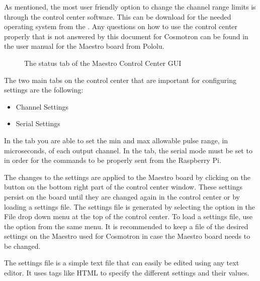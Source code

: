 \documentclass[letterpaper,10pt,english]{sphinxmanual}
\begin{document}
\sphinxAtStartPar
As mentioned, the most user friendly option to change the channel range limits is
through the control center software. This can be download for the needed operating
system from the . Any questions on how to use the
control center properly that is not answered by this document for Cosmotron can be
found in the user manual for the Maestro board from Pololu.

\begin{figure}[htbp]
\centering
\capstart

\noindent{}
\caption{The status tab of the Maestro Control Center GUI}\label{\detokenize{range:id1}}\end{figure}

\sphinxAtStartPar
The two main tabs on the control center that are important for configuring settings
are the following:
\begin{itemize}
\item {} 
\sphinxAtStartPar
Channel Settings

\item {} 
\sphinxAtStartPar
Serial Settings

\end{itemize}

\sphinxAtStartPar
In the  tab you are able to set the min and max allowable pulse
range, in microseconds, of each output channel. In the  tab, the
serial mode must be set to  in order for the commands to be properly
sent from the Raspberry Pi.

\sphinxAtStartPar
The changes to the settings are applied to the Maestro board by clicking on the
 button on the bottom right part of the control center window.
These settings persist on the board until they are changed again in the control
center or by loading a settings file. The settings file is generated by selecting
the  option in the File drop down menu at the top of the
control center. To load a settings file, use the  option
from the same menu. It is recommended to keep a file of the desired settings on
the Maestro used for Cosmotron in case the Maestro board needs to be changed.

\sphinxAtStartPar
The settings file is a simple text file that can easily be edited using any text
editor. It uses tags like HTML to specify the different settings and their values.
\end{document}

